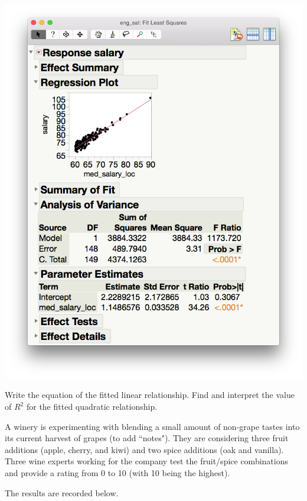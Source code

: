 \documentclass[addpoints]{examsetup}\usepackage[]{graphicx}\usepackage[]{color}
\begin{document}
\begin{questions}
\begin{parts}
   \centerline{\includegraphics[scale=.4]{fit_sal}}

   \begin{subparts}
      \subpart[5] Write the equation of the fitted linear relationship.
      \vspace{2cm}
      \subpart[5] Find and interpret the value of $R^2$ for the fitted quadratic relationship.
      \vspace{2cm}
   \end{subparts}
\end{parts}

\question
A winery is experimenting with blending a small amount of non-grape tastes into its current harvest of grapes (to add ``notes").
They are considering three fruit additions (apple, cherry, and kiwi) and two spice additions (oak and vanilla).
Three wine experts working for the company test the fruit/spice combinations and provide a rating from 0 to 10 (with 10 being the highest).

The results are recorded below.




\end{questions}
\end{document}
